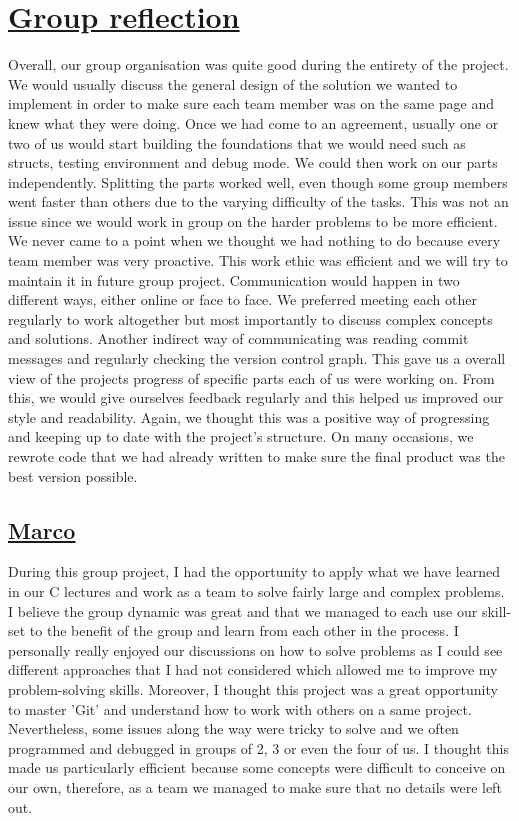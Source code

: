 \documentclass[10pt]{article}
\begin{document}
\section{\underline{Group reflection}}
Overall, our group organisation was quite good during the entirety of the project. We would usually discuss the general design of the solution we wanted to implement in order to make sure each team member was on the same page and knew what they were doing. Once we had come to an agreement, usually one or two of us would start building the foundations that we would need such as structs, testing environment and debug mode. We could then work on our parts independently. Splitting the parts worked well, even though some group members went faster than others due to the varying difficulty of the tasks. This was not an issue since we would work in group on the harder problems to be more efficient. We never came to a point when we thought we had nothing to do because every team member was very proactive. This work ethic was efficient and we will try to maintain it in future group project. Communication would happen in two different ways, either online or face to face. We preferred meeting each other regularly to work altogether but most importantly to discuss complex concepts and solutions. Another indirect way of communicating was reading commit messages and regularly checking the version control graph. This gave us a overall view of the projects progress of specific parts each of us were working on. From this, we would give ourselves feedback regularly and this helped us improved our style and readability. Again, we thought this was a positive way of progressing and keeping up to date with the project's structure. On many occasions, we rewrote code that we had already written to make sure the final product was the best version possible.

\subsection*{\underline{Marco}}
During this group project, I had the opportunity to apply what we have learned in our C lectures and work as a team to solve fairly large and complex problems. I believe the group dynamic was great and that we managed to each use our skill-set to the benefit of the group and learn from each other in the process. I personally really enjoyed our discussions on how to solve problems as I could see different approaches that I had not considered which allowed me to improve my problem-solving skills. Moreover, I thought this project was a great opportunity to master 'Git' and understand how to work with others on a same project. Nevertheless, some issues along the way were tricky to solve and we often programmed and debugged in groups of 2, 3 or even the four of us. I thought this made us particularly efficient because some concepts were difficult to conceive on our own, therefore, as a team we managed to make sure that no details were left out.
\end{document}
